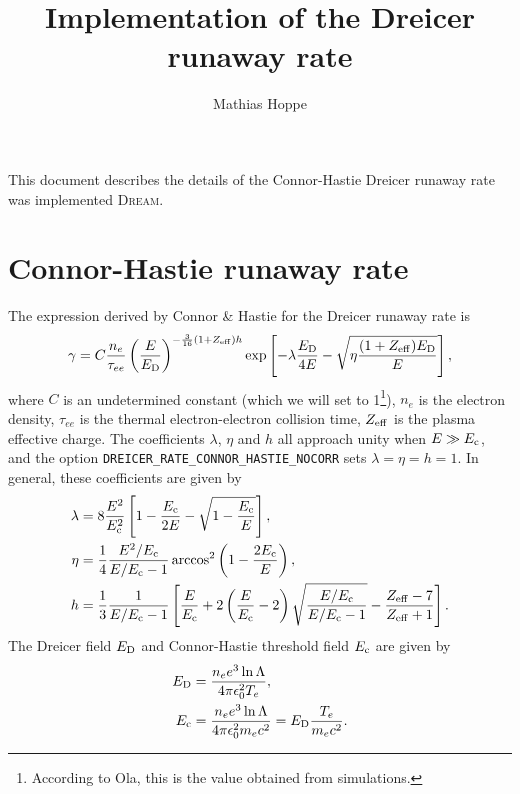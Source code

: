 \documentclass{notes}
\title{Implementation of the Dreicer runaway rate}
\author{Mathias Hoppe}
\newcommand{\DREAM}{\textsc{Dream}}
\newcommand{\Ec}{E_{\rm c}}
\newcommand{\ED}{E_{\rm D}}
\newcommand{\Zeff}{Z_{\rm eff}}
\begin{document}
    \maketitle

    \noindent
    This document describes the details of the Connor-Hastie Dreicer runaway
    rate was implemented \DREAM.

    \section*{Connor-Hastie runaway rate}
    The expression derived by Connor \& Hastie for the Dreicer runaway rate is
    \begin{equation}\label{eq:gammaCH}
        \gamma = C\frac{n_e}{\tau_{ee}} \left( \frac{E}{\ED} \right)^{-\frac{3}{16}(1+\Zeff)h}
        \exp\left[-\lambda\frac{\ED}{4E} - \sqrt{\eta\frac{(1+\Zeff)\ED}{E}} \right],
    \end{equation}
    where $C$ is an undetermined constant (which we will set to 1\footnote{
    According to Ola, this is the value obtained from simulations.}), $n_e$ is
    the electron density, $\tau_{ee}$ is the thermal electron-electron collision
    time, $\Zeff$ is the plasma effective charge. The coefficients $\lambda$,
    $\eta$ and $h$ all approach unity when $E\gg E_{\rm c}$, and the option
    \texttt{DREICER\_RATE\_CONNOR\_HASTIE\_NOCORR} sets $\lambda=\eta=h=1$.
    In general, these coefficients are given by
    \begin{equation}
        \label{eq:gammaCH_var}
        \begin{aligned}
            \lambda &= 8\frac{E^2}{\Ec^2}\left[ 1-\frac{\Ec}{2E}-\sqrt{1-\frac{\Ec}{E}} \right],\\
            \eta &= \frac{1}{4}\frac{E^2/\Ec}{E/\Ec-1}\arccos^2\left( 1-\frac{2\Ec}{E} \right),\\
            h &= \frac{1}{3}\frac{1}{E/\Ec-1}\left[ \frac{E}{\Ec}+
                2\left(\frac{E}{\Ec}-2\right)\sqrt{\frac{E/\Ec}{E/\Ec-1}} - \frac{\Zeff-7}{\Zeff+1}
            \right].
        \end{aligned}
    \end{equation}
    The Dreicer field $\ED$ and Connor-Hastie threshold field $\Ec$ are given by
    \begin{align}
        \ED &= \frac{n_e e^3\ln\Lambda}{4\pi\epsilon_0^2 T_e},\\
        \Ec &= \frac{n_e e^3\ln\Lambda}{4\pi\epsilon_0^2 m_ec^2} = \ED\frac{T_e}{m_ec^2}.
    \end{align}
\end{document}
